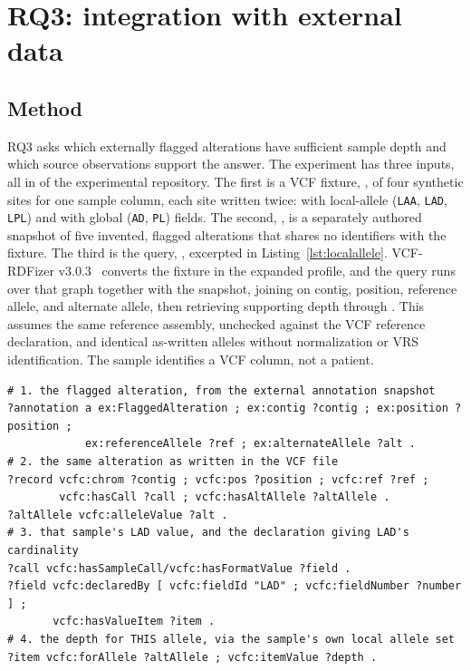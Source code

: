 \section{RQ3: integration with external data}
\subsection{Method}
\label{sec:m-rq3}

RQ3 asks which externally flagged alterations have sufficient sample depth and which source observations support the answer.
The experiment has three inputs, all in \href{https://github.com/ecrum19/SWAT4HCLS_2027/tree/main/RQ3}{} of the experimental repository.
The first is a VCF fixture, , of four synthetic sites for one sample column, each site written twice: with local-allele (\texttt{LAA}, \texttt{LAD}, \texttt{LPL}) and with global (\texttt{AD}, \texttt{PL}) fields.
The second, , is a separately authored snapshot of five invented, flagged alterations that shares no identifiers with the fixture.
The third is the query, , excerpted in Listing~\ref{lst:localallele}.
VCF-RDFizer v3.0.3~\cite{vcfrConverter2026} converts the fixture in the expanded profile, and the query runs over that graph together with the snapshot, joining on contig, position, reference allele, and alternate allele, then retrieving supporting depth through .
This assumes the same reference assembly, unchecked against the VCF reference declaration, and identical as-written alleles without normalization or VRS identification.
The sample identifies a VCF column, not a patient.

\begin{lstlisting}[float=htbp,caption={
Graph-pattern excerpt from the \term{WHERE} clause of \texttt{local-allele-evidence.rq}. 
Prefix declarations, \term{SELECT}, filtering, and provenance retrieval are omitted.},label={lst:localallele}]
# 1. the flagged alteration, from the external annotation snapshot
?annotation a ex:FlaggedAlteration ; ex:contig ?contig ; ex:position ?position ;
            ex:referenceAllele ?ref ; ex:alternateAllele ?alt .
# 2. the same alteration as written in the VCF file
?record vcfc:chrom ?contig ; vcfc:pos ?position ; vcfc:ref ?ref ;
        vcfc:hasCall ?call ; vcfc:hasAltAllele ?altAllele .
?altAllele vcfc:alleleValue ?alt .
# 3. that sample's LAD value, and the declaration giving LAD's cardinality
?call vcfc:hasSampleCall/vcfc:hasFormatValue ?field .
?field vcfc:declaredBy [ vcfc:fieldId "LAD" ; vcfc:fieldNumber ?number ] ;
       vcfc:hasValueItem ?item .
# 4. the depth for THIS allele, via the sample's own local allele set
?item vcfc:forAllele ?altAllele ; vcfc:itemValue ?depth .
\end{lstlisting}

